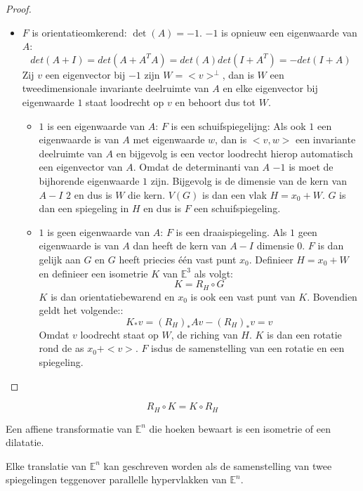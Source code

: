 \documentclass[main.tex]{subfiles}
\begin{document}
\begin{st}
\begin{proof}
\begin{itemize}
    \item $F$ is orientatieomkerend: $\det(A) = -1$.
      $-1$ is opnieuw een eigenwaarde van $A$:
      \[ det(A+I) = det(A+A^{T}A) = det(A)det(I+A^{T}) = -det(I+A) \]
      Zij $v$ een eigenvector bij $-1$ zijn $W=<v>^{\bot}$, dan is $W$ een tweedimensionale invariante deelruimte van $A$ en elke eigenvector bij eigenwaarde $1$ staat loodrecht op $v$ en behoort dus tot $W$.
      \begin{itemize}
      \item $1$ is een eigenwaarde van $A$: $F$ is een schuifspiegelijng:
        Als ook $1$ een eigenwaarde is van $A$ met eigenwaarde $w$, dan is $<v,w>$ een invariante deelruimte van $A$ en bijgevolg is een vector loodrecht hierop automatisch een eigenvector van $A$.\waarom
        Omdat de determinanti van $A$ $-1$ is moet de bijhorende eigenwaarde $1$ zijn.
        Bijgevolg is de dimensie van de kern van $A-I$ $2$ en dus is $W$ die kern.
        $V(G)$ is dan een vlak $H=x_{0}+W$.
        $G$ is dan een spiegeling in $H$ en dus is $F$ een schuifspiegeling.
      \item $1$ is geen eigenwaarde van $A$: $F$ is een draaispiegeling.
        Als $1$ geen eigenwaarde is van $A$ dan heeft de kern van $A-I$ dimensie $0$.
        $F$ is dan gelijk aan $G$ en $G$ heeft priecies \'e\'en vast punt $x_{0}$.
        Definieer $H=x_{0}+W$ en definieer een isometrie $K$ van $\mathbb{E}^{3}$ als volgt:
        \[ K = R_{H} \circ G \]
        $K$ is dan orientatiebewarend \needed en $x_{0}$ is ook een vast punt van $K$.
        Bovendien geldt het volgende::
        \[ K_{*}v = (R_{H})_{*}Av  -(R_{H})_{*}v = v \]
        Omdat $v$ loodrecht staat op $W$, de riching van $H$.
        $K$ is dan een rotatie rond de as $x_{0}+<v>$.
        $F$ isdus de samenstelling van een rotatie en een spiegeling.
      \end{itemize}
    \end{itemize}
  \end{proof}
\end{st}

\begin{st}
  \[ R_{H} \circ K = K \circ R_{H} \]
\end{st}

\begin{ei}
  \examen
  Een affiene transformatie van $\mathbb{E}^{n}$ die hoeken bewaart is een isometrie of een dilatatie.
\end{ei}


\begin{st}
  \examen
  Elke translatie van $\mathbb{E}^{n}$ kan geschreven worden als de samenstelling van twee spiegelingen teggenover parallelle hypervlakken van $\mathbb{E}^{n}$.
\end{st}
\end{document}
